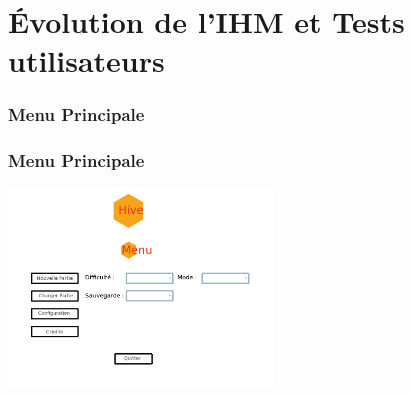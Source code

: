 \documentclass{beamer}
\begin{document}
\section{\'Evolution de l'IHM et Tests utilisateurs}%
\begin{frame}
\end{frame}
\begin{frame}
    \frametitle{Menu Principale}
\end{frame}
\begin{frame}
    \frametitle{Menu Principale}
    \begin{center}
    \includegraphics[width=7cm]{menuPrincipalv1.png}
    \end{center}
\end{frame}
\end{document}

